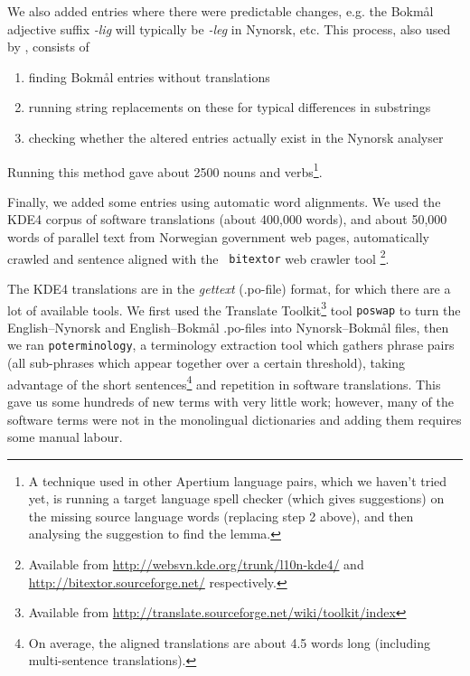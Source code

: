 \documentclass[11pt]{article}
\begin{document}
We also added entries where there were predictable changes, e.g. the
Bokmål adjective suffix \emph{-lig} will typically be \emph{-leg} in Nynorsk,
etc. This process, also used by \citet[p.~4]{tyers2009dpm},
 consists of
\begin{enumerate}
\setlength{\itemsep}{1pt}
\setlength{\parskip}{0pt}
\setlength{\parsep}{0pt}
\item finding Bokmål entries without translations
\item running string replacements on these for typical differences in
   substrings
\item checking whether the altered entries actually exist in the Nynorsk
   analyser
\end{enumerate}
Running
 this method gave about 2500 nouns and verbs\footnote{A technique
  used in other Apertium language pairs, which we haven't tried yet,
  is running a target language spell checker (which gives suggestions)
  on the missing source language words (replacing step 2 above), and
  then analysing the suggestion to find the lemma. }.

Finally, we added some entries using automatic word alignments. We
used the KDE4 corpus of software translations (about 400,000 words),
and about 50,000 words of parallel text from Norwegian government web
pages, automatically crawled and sentence aligned with the {\tt \small
  bitextor} web crawler tool
\citep{espla-gomis2009bfs}\footnote{Available from
  \href{http://websvn.kde.org/trunk/l10n-kde4/}{http://websvn.kde.org/trunk/l10n-kde4/}
  and
  \href{http://bitextor.sourceforge.net/}{http://bitextor.sourceforge.net/}
  respectively.}.

The KDE4 translations are in the \emph{gettext} (.po-file) format, for
which there are a lot of available tools. We first used the Translate
Toolkit\footnote{Available from
  \href{http://translate.sourceforge.net/wiki/toolkit/index}{http://translate.sourceforge.net/wiki/toolkit/index}
} tool {\tt \small  poswap} to turn the English–Nynorsk and English–Bokmål
.po-files into Nynorsk–Bokmål files, then we ran
{\tt \small  poterminology}, a terminology extraction tool which gathers
 phrase pairs (all sub-phrases which appear together over a
certain threshold), taking advantage of the short
sentences\footnote{On average, the aligned translations are about 4.5
  words long (including multi-sentence translations).} and 
repetition in software translations. This gave us some hundreds of
new terms with very little work; however, many of the software terms
were
not in the monolingual dictionaries and 
 adding them requires some manual labour.
\end{document}
